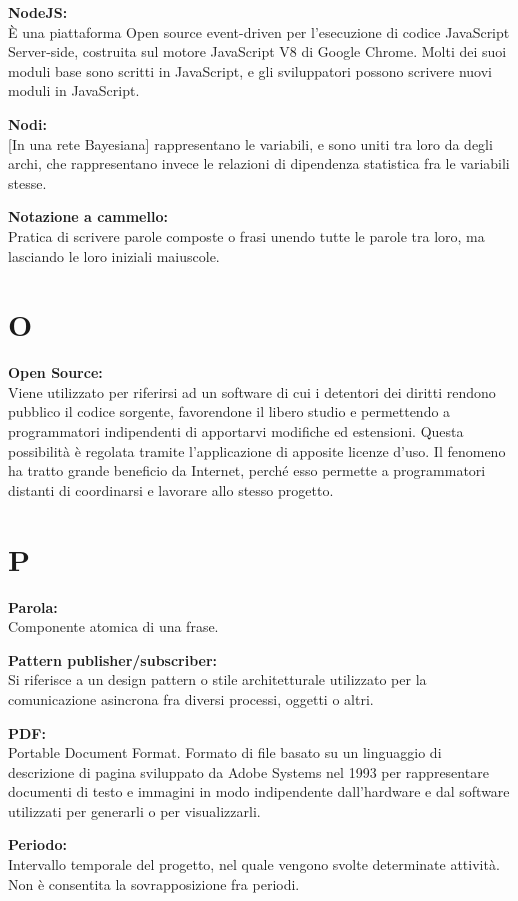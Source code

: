 \documentclass[a4paper, oneside, openany, dvipsnames, table]{article}
\begin{document}
\textbf{NodeJS:}\\	\`E una piattaforma Open source event-driven per l'esecuzione di codice JavaScript Server-side, costruita sul motore JavaScript V8 di Google Chrome. Molti dei suoi moduli base sono scritti in JavaScript, e gli sviluppatori possono scrivere nuovi moduli in JavaScript.

\textbf{Nodi:}\\ 
{[}In una rete Bayesiana{]} rappresentano le variabili, e sono uniti tra loro da degli archi, che rappresentano invece le relazioni di dipendenza statistica fra le variabili stesse.

\textbf{Notazione a cammello:}\\	Pratica di scrivere parole composte o frasi unendo tutte le parole tra loro, ma lasciando le loro iniziali maiuscole.

\newpage
\section{O}
\textbf{Open Source:}\\	Viene utilizzato per riferirsi ad un software di cui i detentori dei diritti rendono pubblico il codice sorgente, favorendone il libero studio e permettendo a programmatori indipendenti di apportarvi modifiche ed estensioni. Questa possibilità è regolata tramite l'applicazione di apposite licenze d'uso. Il fenomeno ha tratto grande beneficio da Internet, perché esso permette a programmatori distanti di coordinarsi e lavorare allo stesso progetto.

\newpage
\section{P}
\label{par:parola}
\textbf{Parola:}\\	Componente atomica di una frase.

\textbf{Pattern publisher/subscriber:}\\	 Si riferisce a un design pattern o stile architetturale utilizzato per la comunicazione asincrona fra diversi processi, oggetti o altri.

\textbf{PDF:}\\	Portable Document Format. Formato di file basato su un linguaggio di descrizione di pagina sviluppato da Adobe Systems nel 1993 per rappresentare documenti di testo e immagini in modo indipendente dall'hardware e dal software utilizzati per generarli o per visualizzarli.

\textbf{Periodo:}\\	Intervallo temporale del progetto, nel quale vengono svolte determinate attività. Non è consentita la sovrapposizione fra periodi.
\end{document}
